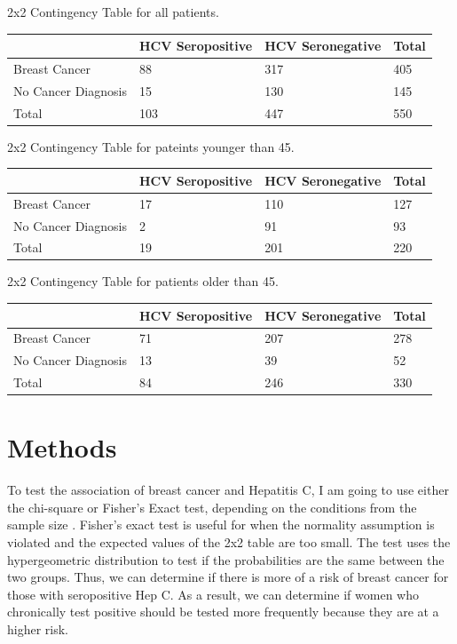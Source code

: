 \documentclass[12pt, titlepage]{article}
\begin{document}
\vspace{1cm}

2x2 Contingency Table for all patients.

\begin{tabular}{ | m{4cm} | m{4cm}| m{4cm} | m{2cm} | }
  \hline
    & HCV Seropositive & HCV Seronegative & Total\\ 
  \hline
  Breast Cancer & 88 & 317 & 405 \\ 
  \hline
  No Cancer Diagnosis & 15 & 130 & 145 \\ 
  \hline
  Total & 103 & 447 & 550 \\ 
  \hline
\end{tabular}

\vspace{1cm}

2x2 Contingency Table for pateints younger than 45.

\begin{tabular}{ | m{4cm} | m{4cm}| m{4cm} | m{2cm} | }
  \hline
    & HCV Seropositive & HCV Seronegative & Total\\ 
  \hline
  Breast Cancer & 17 & 110 & 127 \\ 
  \hline
  No Cancer Diagnosis & 2 & 91 & 93 \\ 
  \hline
  Total & 19 & 201 & 220 \\ 
  \hline
\end{tabular}

\vspace{1cm}

2x2 Contingency Table for patients older than 45.

\begin{tabular}{ | m{4cm} | m{4cm}| m{4cm} | m{2cm} | }
  \hline
    & HCV Seropositive & HCV Seronegative & Total\\ 
  \hline
  Breast Cancer & 71 & 207 & 278 \\ 
  \hline
  No Cancer Diagnosis & 13 & 39 & 52 \\ 
  \hline
  Total & 84 & 246 & 330 \\ 
  \hline
\end{tabular}

\section{Methods}
\label{sec:methods}

To test the association of breast cancer and Hepatitis C, I am going to use either the chi-square or Fisher's Exact test, depending on the
conditions from the sample size \citep{warner2013testing}. Fisher's exact test is useful for when the normality assumption is violated 
and the expected values of the 2x2 table are too small. The test uses the hypergeometric distribution to test if the probabilities are
the same between the two groups. Thus, we can determine if there is more of a risk of breast cancer for those with seropositive Hep C. As
 a result, we can determine if women who chronically test positive should be tested more frequently because they are at a higher risk. 
 
\end{document}
